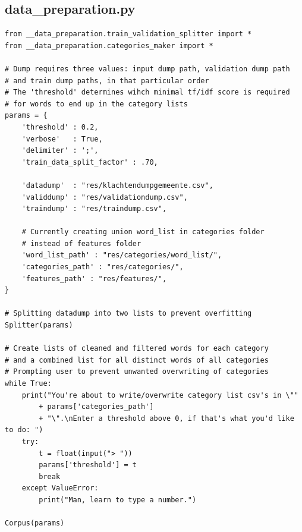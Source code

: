 \documentclass[journal]{IEEEtran}
\begin{document}
\subsection*{data\_preparation.py}
\begin{lstlisting}
from __data_preparation.train_validation_splitter import *
from __data_preparation.categories_maker import *

# Dump requires three values: input dump path, validation dump path
# and train dump paths, in that particular order
# The 'threshold' determines wihch minimal tf/idf score is required
# for words to end up in the category lists
params = {
	'threshold' : 0.2,
	'verbose'	: True,
	'delimiter' : ';',
	'train_data_split_factor' : .70,

	'datadump' 	: "res/klachtendumpgemeente.csv",
	'validdump' : "res/validationdump.csv",
	'traindump' : "res/traindump.csv",

	# Currently creating union word_list in categories folder
	# instead of features folder
	'word_list_path' : "res/categories/word_list/",
	'categories_path' : "res/categories/",
	'features_path' : "res/features/",
}

# Splitting datadump into two lists to prevent overfitting
Splitter(params)

# Create lists of cleaned and filtered words for each category
# and a combined list for all distinct words of all categories
# Prompting user to prevent unwanted overwriting of categories
while True:
	print("You're about to write/overwrite category list csv's in \""
		+ params['categories_path']
		+ "\".\nEnter a threshold above 0, if that's what you'd like to do: ")
	try:
		t = float(input("> "))
		params['threshold'] = t
		break
	except ValueError:
		print("Man, learn to type a number.")

Corpus(params)
\end{lstlisting}
\end{document}

